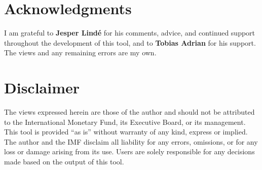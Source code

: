 \documentclass[11pt]{article}
\theoremstyle{definition}
\theoremstyle{remark}
\begin{document}
\section*{Acknowledgments}

I am grateful to \textbf{Jesper Lind\'e} for his comments, advice, and
continued support throughout the development of this tool, and to
\textbf{Tobias Adrian} for his support. The views and any remaining
errors are my own.

\section*{Disclaimer}

The views expressed herein are those of the author and should not be
attributed to the International Monetary Fund, its Executive Board, or
its management.  This tool is provided ``as is'' without warranty of
any kind, express or implied.  The author and the IMF disclaim all
liability for any errors, omissions, or for any loss or damage arising
from its use.  Users are solely responsible for any decisions made
based on the output of this tool.

\clearpage


\end{document}
